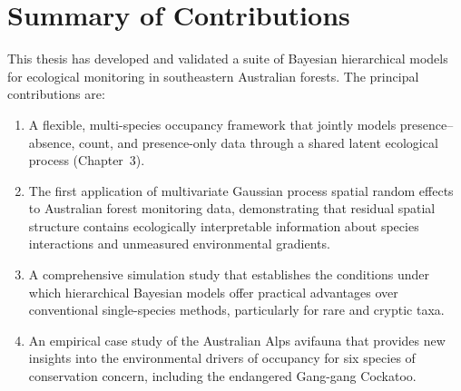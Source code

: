 \section{Summary of Contributions}

This thesis has developed and validated a suite of Bayesian hierarchical models
for ecological monitoring in southeastern Australian forests. The principal
contributions are:

\begin{enumerate}[leftmargin=*,itemsep=4pt]
  \item A flexible, multi-species occupancy framework that jointly models
        presence--absence, count, and presence-only data through a shared
        latent ecological process (Chapter~3).
  \item The first application of multivariate Gaussian process spatial random
        effects to Australian forest monitoring data, demonstrating that
        residual spatial structure contains ecologically interpretable
        information about species interactions and unmeasured environmental
        gradients.
  \item A comprehensive simulation study that establishes the conditions under
        which hierarchical Bayesian models offer practical advantages over
        conventional single-species methods, particularly for rare and cryptic
        taxa.
  \item An empirical case study of the Australian Alps avifauna that provides
        new insights into the environmental drivers of occupancy for six
        species of conservation concern, including the endangered Gang-gang
        Cockatoo.
\end{enumerate}
